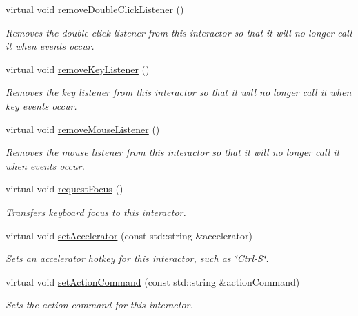\begin{DoxyCompactItemize}
virtual void \mbox{\hyperlink{classsgl_1_1GInteractor_aa4250907e4cdd77349c04f0cf5cdd3d3}{remove\+Double\+Click\+Listener}} ()
\begin{DoxyCompactList}\small\item\em Removes the double-\/click listener from this interactor so that it will no longer call it when events occur. \end{DoxyCompactList}\item 
virtual void \mbox{\hyperlink{classsgl_1_1GInteractor_a43095f41cab3be732b49f29970484b05}{remove\+Key\+Listener}} ()
\begin{DoxyCompactList}\small\item\em Removes the key listener from this interactor so that it will no longer call it when key events occur. \end{DoxyCompactList}\item 
virtual void \mbox{\hyperlink{classsgl_1_1GInteractor_aff47f71ce47e688a07c9d38dc92fcc11}{remove\+Mouse\+Listener}} ()
\begin{DoxyCompactList}\small\item\em Removes the mouse listener from this interactor so that it will no longer call it when events occur. \end{DoxyCompactList}\item 
virtual void \mbox{\hyperlink{classsgl_1_1GInteractor_a519fb2ac767f8b2febbb50b898b8c8cb}{request\+Focus}} ()
\begin{DoxyCompactList}\small\item\em Transfers keyboard focus to this interactor. \end{DoxyCompactList}\item 
virtual void \mbox{\hyperlink{classsgl_1_1GInteractor_ad15f102f62e2960576012f1aa0ba4b2e}{set\+Accelerator}} (const std\+::string \&accelerator)
\begin{DoxyCompactList}\small\item\em Sets an accelerator hotkey for this interactor, such as \char`\"{}\+Ctrl-\/\+S\char`\"{}. \end{DoxyCompactList}\item 
virtual void \mbox{\hyperlink{classsgl_1_1GInteractor_a4b5843fe3030e038a1ba54cc03389bcf}{set\+Action\+Command}} (const std\+::string \&action\+Command)
\begin{DoxyCompactList}\small\item\em Sets the action command for this interactor. \end{DoxyCompactList}\item 

\end{DoxyCompactItemize}
